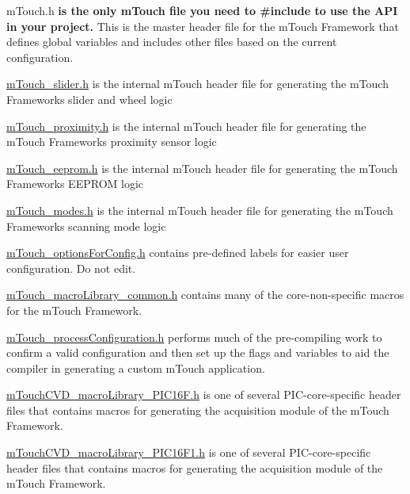 \begin{DoxyItemize}
\begin{DoxyItemize}
\begin{DoxyItemize}
\begin{DoxyItemize}
\begin{DoxyItemize}
\item m\+Touch.\+h {\bfseries is the only m\+Touch file you need to \#include to use the A\+P\+I in your project.} This is the master header file for the m\+Touch Framework that defines global variables and includes other files based on the current configuration. 
\item \hyperlink{m_touch__slider_8h}{m\+Touch\+\_\+slider.\+h} is the internal m\+Touch header file for generating the m\+Touch Framework\textquotesingle{}s slider and wheel logic 
\item \hyperlink{m_touch__proximity_8h}{m\+Touch\+\_\+proximity.\+h} is the internal m\+Touch header file for generating the m\+Touch Framework\textquotesingle{}s proximity sensor logic 
\item \hyperlink{m_touch__eeprom_8h}{m\+Touch\+\_\+eeprom.\+h} is the internal m\+Touch header file for generating the m\+Touch Framework\textquotesingle{}s E\+E\+P\+R\+O\+M logic 
\item \hyperlink{m_touch__modes_8h}{m\+Touch\+\_\+modes.\+h} is the internal m\+Touch header file for generating the m\+Touch Framework\textquotesingle{}s scanning mode logic 
\item \hyperlink{m_touch__options_for_config_8h}{m\+Touch\+\_\+options\+For\+Config.\+h} contains pre-\/defined labels for easier user configuration. Do not edit. 
\item \hyperlink{m_touch__macro_library__common_8h}{m\+Touch\+\_\+macro\+Library\+\_\+common.\+h} contains many of the core-\/non-\/specific macros for the m\+Touch Framework. 
\item \hyperlink{m_touch__process_configuration_8h}{m\+Touch\+\_\+process\+Configuration.\+h} performs much of the pre-\/compiling work to confirm a valid configuration and then set up the flags and variables to aid the compiler in generating a custom m\+Touch application. 
\item \hyperlink{m_touch_c_v_d__macro_library___p_i_c16_f_8h}{m\+Touch\+C\+V\+D\+\_\+macro\+Library\+\_\+\+P\+I\+C16\+F.\+h} is one of several P\+I\+C-\/core-\/specific header files that contains macros for generating the acquisition module of the m\+Touch Framework. 
\item \hyperlink{m_touch_c_v_d__macro_library___p_i_c16_f1_8h}{m\+Touch\+C\+V\+D\+\_\+macro\+Library\+\_\+\+P\+I\+C16\+F1.\+h} is one of several P\+I\+C-\/core-\/specific header files that contains macros for generating the acquisition module of the m\+Touch Framework. 

\end{DoxyItemize}
\end{DoxyItemize}
\end{DoxyItemize}
\end{DoxyItemize}
\end{DoxyItemize}
